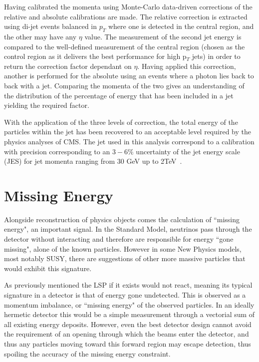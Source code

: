 Having calibrated the momenta using Monte-Carlo data-driven corrections of the relative and absolute calibrations are made. The relative correction is extracted using di-jet events balanced in $p_{T}$ where one is detected in the central region, and the other may have any $\eta$ value. The measurement of the second jet energy is compared to the well-defined measurement of the central region (chosen as the control region as it delivers the best performance for high p$_{T}$ jets) in order to return the correction factor dependant on $\eta$.  Having applied this correction, another is performed for the absolute using an events where a photon lies back to back with a jet. Comparing the momenta of the two gives an understanding of the distribution of the percentage of energy that has been included in a jet yielding the required factor.

With the application of the three levels of correction, the total energy of the particles within the jet has been recovered to an acceptable level required by the physics analyses of CMS. The jet used in this analysis correspond to a calibration with precision corresponding to an $3 - 6 \%$ uncertainty of the jet energy scale (JES) for jet momenta ranging from 30 GeV up to 2TeV~\cite{JME-10-010}.

\section{Missing Energy}

Alongside reconstruction of physics objects comes the calculation of ``missing energy", an important signal. In the Standard Model, neutrinos pass through the detector without interacting and therefore are responsible for energy ``gone missing", alone of the known particles. However in some New Physics models, most notably SUSY, there are suggestions of other more massive particles that would exhibit this signature. 
 
As previously mentioned the LSP if it exists would not react, meaning its typical signature in a detector is that of energy gone undetected. This is observed as a momentum imbalance, or ``missing energy" of the observed particles. In an ideally hermetic detector this would be a simple measurement through a vectorial sum of all existing energy deposits. However, even the best detector design cannot avoid the requirement of an opening through which the beams enter the detector, and thus any particles moving toward this forward region may escape detection, thus spoiling the accuracy of the missing energy constraint. 


